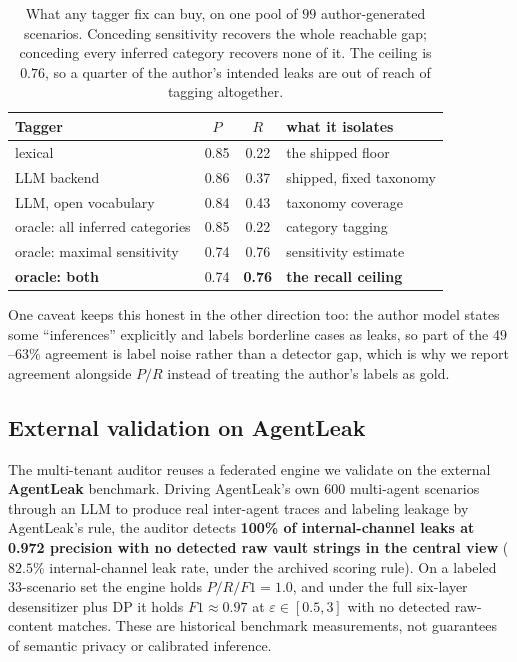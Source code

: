 \begin{table}[t]\centering\small
\begin{tabular}{lccl}
\toprule
Tagger & $P$ & $R$ & what it isolates \\
\midrule
lexical & 0.85 & 0.22 & the shipped floor \\
LLM backend & 0.86 & 0.37 & shipped, fixed taxonomy \\
LLM, open vocabulary & 0.84 & 0.43 & taxonomy coverage \\
oracle: all inferred categories & 0.85 & 0.22 & category tagging \\
oracle: maximal sensitivity & 0.74 & 0.76 & sensitivity estimate \\
\textbf{oracle: both} & 0.74 & \textbf{0.76} & \textbf{the recall ceiling} \\
\bottomrule
\end{tabular}
\caption{What any tagger fix can buy, on one pool of $99$ author-generated
scenarios. Conceding sensitivity recovers the whole reachable gap; conceding every
inferred category recovers none of it. The ceiling is $0.76$, so a quarter of the
author's intended leaks are out of reach of tagging altogether.}
\label{tab:ceiling}
\end{table}

One caveat keeps this honest in the other direction too: the author model states
some ``inferences'' explicitly and labels borderline cases as leaks, so part of the
$49$--$63\%$ agreement is label noise rather than a detector gap, which is why we
report agreement alongside $P/R$ instead of treating the author's labels as gold.

\subsection{External validation on AgentLeak}
The multi-tenant
auditor reuses a federated engine we validate on the external \textbf{AgentLeak}
benchmark. Driving AgentLeak's own 600 multi-agent scenarios through an LLM to
produce real inter-agent traces and labeling leakage by AgentLeak's rule, the
auditor detects \textbf{100\% of internal-channel leaks at 0.972 precision with
no detected raw vault strings in the central view} ($82.5\%$ internal-channel leak rate,
under the archived scoring rule). On a labeled 33-scenario set the engine holds $P/R/F1=1.0$,
and under the full six-layer desensitizer plus DP it holds $F1\approx0.97$ at
$\varepsilon\in[0.5,3]$ with no detected raw-content matches. These are historical benchmark
measurements, not guarantees of semantic privacy or calibrated inference.

